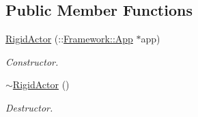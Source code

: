 \subsection*{Public Member Functions}
\begin{DoxyCompactItemize}
\item 
\hypertarget{classContent_1_1Actor_1_1RigidActor_a6162c612f27c2eb974c0dbf754faa486}{
\hyperlink{classContent_1_1Actor_1_1RigidActor_a6162c612f27c2eb974c0dbf754faa486}{RigidActor} (::\hyperlink{classFramework_1_1App}{Framework::App} $\ast$app)}
\label{classContent_1_1Actor_1_1RigidActor_a6162c612f27c2eb974c0dbf754faa486}

\begin{DoxyCompactList}\small\item\em Constructor. \item\end{DoxyCompactList}\item 
\hypertarget{classContent_1_1Actor_1_1RigidActor_a7b75246ce94638298551c6dd5409907d}{
\hyperlink{classContent_1_1Actor_1_1RigidActor_a7b75246ce94638298551c6dd5409907d}{$\sim$RigidActor} ()}
\label{classContent_1_1Actor_1_1RigidActor_a7b75246ce94638298551c6dd5409907d}

\begin{DoxyCompactList}\small\item\em Destructor. \item\end{DoxyCompactList}\end{DoxyCompactItemize}
